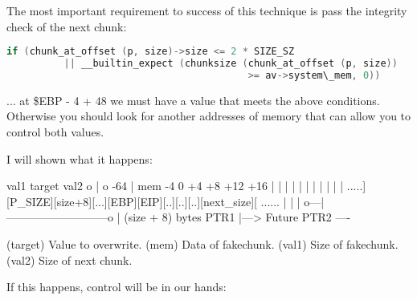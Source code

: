 \documentclass[12pt]{article}
\begin{document}
The most important requirement to success of this technique is pass the
integrity check of the next chunk:

\begin{lstlisting}[language=C]
      if (chunk_at_offset (p, size)->size <= 2 * SIZE_SZ
          || __builtin_expect (chunksize (chunk_at_offset (p, size))
                                          >= av->system\_mem, 0))
\end{lstlisting}

... at \$EBP - 4 + 48 we must have a value that meets the above conditions.
Otherwise you should look for another addresses of memory that can allow
you to control both values.


I will shown what it happens:
\begin{verbnobox}[\small]

                   val1         target                val2
                    o             |                     o
      -64           |  mem  -4    0   +4  +8  +12 +16   |
       |            |   |    |    |    |   |   |   |    |
  .....][P_SIZE][size+8][...][EBP][EIP][..][..][..][next_size][ ......
                    |   |                           |
                    o---|---------------------------o
                        |      (size + 8) bytes
                       PTR1
                        |---> Future PTR2
                                     ----

   (target) Value to overwrite.
   (mem)  Data of fakechunk.
   (val1) Size of fakechunk.
   (val2) Size of next chunk.

\end{verbnobox}
If this happens, control will be in our hands:
\end{document}
